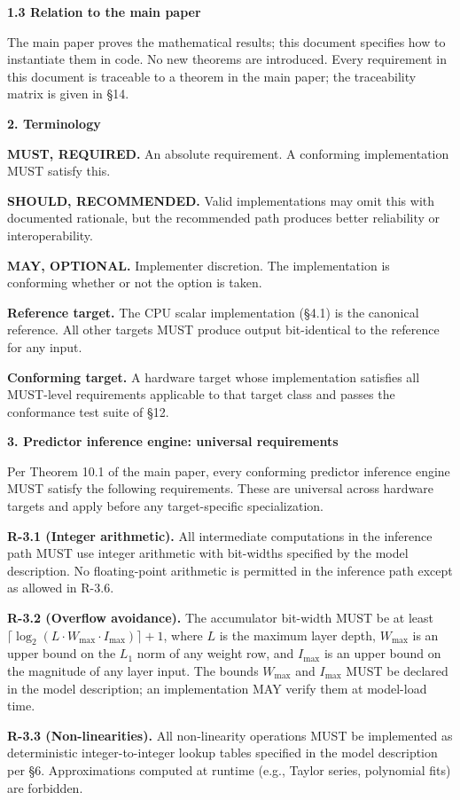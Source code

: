 \documentclass[
]{article}
\begin{document}
\textbf{1.3 Relation to the main paper}

The main paper proves the mathematical results; this document specifies
how to instantiate them in code. No new theorems are introduced. Every
requirement in this document is traceable to a theorem in the main
paper; the traceability matrix is given in §14.

\textbf{2. Terminology}

\textbf{MUST, REQUIRED.} An absolute requirement. A conforming
implementation MUST satisfy this.

\textbf{SHOULD, RECOMMENDED.} Valid implementations may omit this with
documented rationale, but the recommended path produces better
reliability or interoperability.

\textbf{MAY, OPTIONAL.} Implementer discretion. The implementation is
conforming whether or not the option is taken.

\textbf{Reference target.} The CPU scalar implementation (§4.1) is the
canonical reference. All other targets MUST produce output bit-identical
to the reference for any input.

\textbf{Conforming target.} A hardware target whose implementation
satisfies all MUST-level requirements applicable to that target class
and passes the conformance test suite of §12.

\textbf{3. Predictor inference engine: universal requirements}

Per Theorem 10.1 of the main paper, every conforming predictor inference
engine MUST satisfy the following requirements. These are universal
across hardware targets and apply before any target-specific
specialization.

\textbf{R-3.1 (Integer arithmetic).} All intermediate computations in
the inference path MUST use integer arithmetic with bit-widths specified
by the model description. No floating-point arithmetic is permitted in
the inference path except as allowed in R-3.6.

\textbf{R-3.2 (Overflow avoidance).} The accumulator bit-width MUST
be at least
$\lceil \log_2(L \cdot W_{\max} \cdot I_{\max}) \rceil + 1$, where
$L$ is the maximum layer depth, $W_{\max}$ is an upper bound on the
$L_1$ norm of any weight row, and $I_{\max}$ is an upper bound on
the magnitude of any layer input. The bounds $W_{\max}$ and
$I_{\max}$ MUST be declared in the model description; an
implementation MAY verify them at model-load time.

\textbf{R-3.3 (Non-linearities).} All non-linearity operations MUST be
implemented as deterministic integer-to-integer lookup tables specified
in the model description per §6. Approximations computed at runtime
(e.g., Taylor series, polynomial fits) are forbidden.
\end{document}
